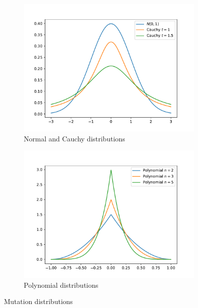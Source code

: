 \begin{figure}[b]
    \begin{subfigure}[t]{0.45\textwidth}
        \includegraphics[width=\textwidth]{img/render_distributions_normalcauchy.pdf}
        \caption{Normal and Cauchy distributions}
        \label{fig:mutationdistributionnormalcacuchy}
    \end{subfigure}
    \hfill
    \begin{subfigure}[t]{0.45\textwidth}
        \includegraphics[width=\textwidth]{img/render_distributions_polynomial.pdf}
        \caption{Polynomial distributions}
        \label{fig:mutationdistributionpolynomial}
    \end{subfigure}
    \caption{Mutation distributions}
\end{figure}

